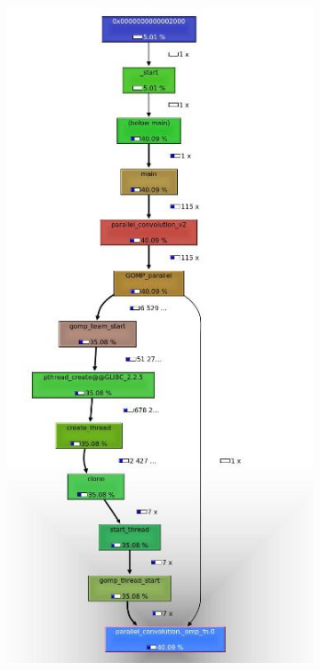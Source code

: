 \documentclass{article}
\begin{document}
\begin{figure}[H]
  \begin{subfigure}[b]{0.50\textwidth}
    \includegraphics[width=\textwidth]{figures/parallel1.jpg}

\end{subfigure}
\end{figure}
\end{document}
